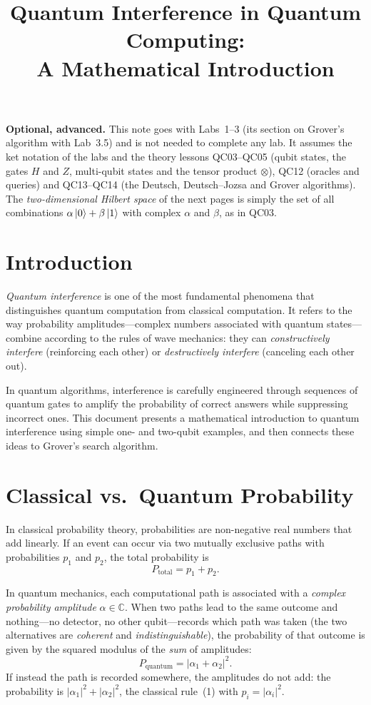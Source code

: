 \documentclass[a4paper,11pt]{article}
\title{Quantum Interference in Quantum Computing:\\ A Mathematical Introduction}
\author{}
\date{}
\providecommand{\ket}[1]{\mathinner{|{#1}\rangle}}
\begin{document}
\maketitle

\noindent\textbf{Optional, advanced.} This note goes with Labs~1--3 (its section on Grover's algorithm
with Lab~3.5) and is not needed to complete any lab. It assumes the ket notation of the labs and the
theory lessons QC03--QC05 (qubit states, the gates $H$ and $Z$, multi-qubit states and the tensor
product $\otimes$), QC12 (oracles and queries) and QC13--QC14 (the Deutsch, Deutsch--Jozsa and Grover
algorithms). The \emph{two-dimensional Hilbert space} of the next pages is simply the set of all
combinations $\alpha\ket{0} + \beta\ket{1}$ with complex $\alpha$ and $\beta$, as in QC03.

\section*{Introduction}

\emph{Quantum interference} is one of the most fundamental phenomena that distinguishes quantum
computation from classical computation. It refers to the way probability amplitudes---complex
numbers associated with quantum states---combine according to the rules of wave mechanics:
they can \emph{constructively interfere} (reinforcing each other) or \emph{destructively interfere}
(canceling each other out).

In quantum algorithms, interference is carefully engineered through sequences of quantum gates
to amplify the probability of correct answers while suppressing incorrect ones. This document
presents a mathematical introduction to quantum interference using simple one- and two-qubit
examples, and then connects these ideas to Grover's search algorithm.

\section*{Classical vs.\ Quantum Probability}

In classical probability theory, probabilities are non-negative real numbers that add linearly.
If an event can occur via two mutually exclusive paths with probabilities $p_1$ and $p_2$, the
total probability is
\begin{equation}
  P_{\text{total}} = p_1 + p_2.
\end{equation}

In quantum mechanics, each computational path is associated with a \emph{complex probability
amplitude} $\alpha \in \mathbb{C}$. When two paths lead to the same outcome and nothing---no detector,
no other qubit---records which path was taken (the two alternatives are \emph{coherent} and
\emph{indistinguishable}), the probability of that outcome is given by the squared modulus of the
\emph{sum} of amplitudes:
\begin{equation}
  P_{\text{quantum}} = |\alpha_1 + \alpha_2|^2.
\end{equation}
If instead the path is recorded somewhere, the amplitudes do not add: the probability is
${|\alpha_1|^2 + |\alpha_2|^2}$, the classical rule~(1) with $p_i = |\alpha_i|^2$.
\end{document}
